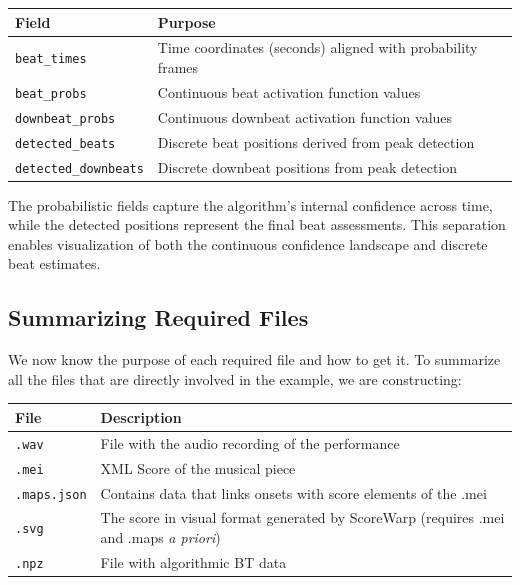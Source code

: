\begin{table}[h]
\centering
\begin{tabular}{ll}
\hline
\textbf{Field} & \textbf{Purpose} \\
\hline
\texttt{beat\_times} & Time coordinates (seconds) aligned with probability frames \\
\texttt{beat\_probs} & Continuous beat activation function values \\
\texttt{downbeat\_probs} & Continuous downbeat activation function values \\
\texttt{detected\_beats} & Discrete beat positions derived from peak detection \\
\texttt{detected\_downbeats} & Discrete downbeat positions from peak detection \\
\hline
\end{tabular}
\end{table}

\noindent The probabilistic fields capture the algorithm's internal confidence across time, while the detected positions represent the final beat assessments. This separation enables visualization of both the continuous confidence landscape and discrete beat estimates.

\subsection{Summarizing Required Files}
We now know the purpose of each required file and how to get it. To summarize all the files that are directly involved in the example, we are constructing:

\begin{table}[h]
\centering
\begin{tabular}{ll}
\hline
\textbf{File} & \textbf{Description} \\
\hline
\texttt{.wav} &  File with the audio recording of the performance \\
\texttt{.mei} &  XML Score of the musical piece\\
\texttt{.maps.json} &  Contains data that links onsets with score elements of the .mei\\
\texttt{.svg} &  The score in visual format generated by ScoreWarp (requires .mei and .maps \textit{a priori})\\
\texttt{.npz} &  File with algorithmic BT data\\
\hline
\end{tabular}
\end{table}

